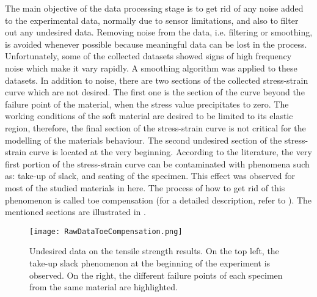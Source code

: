 The main objective of the data processing stage is to get rid of any noise added to the experimental data, normally due to sensor limitations, and also to filter out any undesired data. Removing noise from the data, i.e. filtering or smoothing, is avoided whenever possible because meaningful data can be lost in the process. Unfortunately, some of the collected datasets showed signs of high frequency noise which make it vary rapidly. A smoothing algorithm was applied to these datasets. In addition to noise, there are two sections of the collected stress-strain curve which are not desired. The first one is the section of the curve beyond the failure point of the material, when the stress value precipitates to zero. The working conditions of the soft material are desired to be limited to its elastic region, therefore, the final section of the stress-strain curve is not critical for the modelling of the materials behaviour. The second undesired section of the stress-strain curve is located at the very beginning. According to the literature, the very first portion of the stress-strain curve can be contaminated with phenomena such as: take-up of slack, and seating of the specimen. This effect was observed for most of the studied materials in here. The process of how to get rid of this phenomenon is called toe compensation (for a detailed description, refer to \cite{astmd638}). The mentioned sections are illustrated in .

\begin{figure}[htb!]
    \centering
    \texttt{[image: RawDataToeCompensation.png]}
    \caption{Undesired data on the tensile strength results. On the top left, the take-up slack phenomenon at the beginning of the experiment is observed. On the right, the different failure points of each specimen from the same material are highlighted.}
    \label{fig:rawData}
\end{figure}

